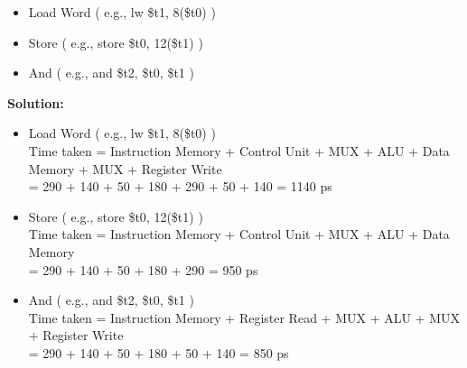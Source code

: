\documentclass[a4paper,10pt]{article}
\begin{document}
\begin{enumerate}
\begin{center}
\begin{table}[h]
\begin{tabular}{ |l|l|l|l|l|l|l|l|}
\end{tabular}
\end{table}
\end{center}
\begin{itemize}
    \item Load Word ( e.g., lw \$t1, 8(\$t0) ) 
    \item  Store ( e.g., store \$t0, 12(\$t1) ) 
    \item And ( e.g., and \$t2, \$t0, \$t1 ) 
\end{itemize}
  \textbf{Solution:}\\
  \begin{itemize}
      \item   Load Word ( e.g., lw \$t1, 8(\$t0) ) \\
Time taken = Instruction Memory + Control Unit + MUX + ALU + Data Memory + MUX + Register Write \\
= 290 + 140 + 50 + 180 + 290 + 50 + 140 = 1140 ps
\item Store ( e.g., store \$t0, 12(\$t1) ) \\
Time taken = Instruction Memory + Control Unit + MUX + ALU + Data Memory \\
= 290 + 140 + 50 + 180 + 290 = 950 ps 
\item  And ( e.g., and \$t2, \$t0, \$t1 )  \\
Time taken = Instruction Memory + Register Read + MUX + ALU + MUX + Register Write\\ = 290 + 140 + 50 + 180 + 50 + 140 = 850 ps

  \end{itemize}



  \end{enumerate}
\end{document}
